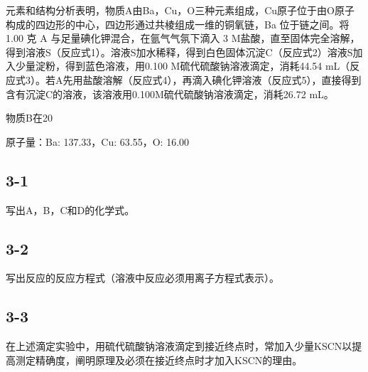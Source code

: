 元素和结构分析表明，物质A由Ba，Cu，O三种元素组成，Cu原⼦位于由O原⼦构成的四边形的中⼼，四边形通过共棱组成⼀维的铜氧链，Ba 位于链之间。将 1.00 克 A 与⾜量碘化钾混合，在氩⽓⽓氛下滴⼊ 3 M盐酸，直⾄固体完全溶解，得到溶液S（反应式1）。溶液S加⽔稀释，得到⽩⾊固体沉淀C（反应式2）溶液S加⼊少量淀粉，得到蓝⾊溶液，⽤0.100 M硫代硫酸钠溶液滴定，消耗44.54 mL（反应式3）。若A先⽤盐酸溶解（反应式4），再滴⼊碘化钾溶液（反应式5），直接得到含有沉淀C的溶液，该溶液⽤0.100M硫代硫酸钠溶液滴定，消耗26.72 mL。

物质B在20%

原⼦量：Ba: 137.33，Cu: 63.55，O: 16.00

\subsection*{3-1}
写出A，B，C和D的化学式。

\subsection*{3-2}
写出反应的反应⽅程式（溶液中反应必须⽤离⼦⽅程式表⽰）。

\subsection*{3-3}
在上述滴定实验中，⽤硫代硫酸钠溶液滴定到接近终点时，常加⼊少量KSCN以提⾼测定精确度，阐明原理及必须在接近终点时才加⼊KSCN的理由。
